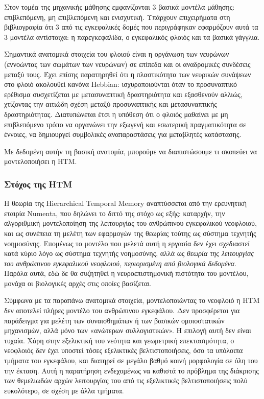   Στον τομέα της μηχανικής μάθησης εμφανίζονται 3 βασικά μοντέλα μάθησης: επιβλεπόμενη, μη επιβλεπόμενη και ενισχυτική.
  Υπάρχουν επιχειρήματα στη βιβλιογραφία \parencite{doyaWhatAreComputations1999} ότι 3 από τις εγκεφαλικές δομές που περιγράφηκαν εφαρμόζουν
  αυτά τα 3 μοντέλα αντίστοιχα: η παρεγκεφαλίδα, ο εγκεφαλικός φλοιός και τα βασικά γάγγλια.

  Σημαντικά ανατομικά στοιχεία του φλοιού είναι η οργάνωση των νευρώνων (εννοώντας των σωμάτων των νευρώνων) σε επίπεδα και οι αναδρομικές συνδέσεις μεταξύ τους.
  Έχει επίσης παρατηρηθεί ότι η πλαστικότητα των νευρικών συνάψεων στο φλοιό ακολουθεί κανόνα Hebbian:
  ισχυροποιούνται όταν το προσυναπτικό ερέθισμα συσχετίζεται με μετασυναπτική δραστηριότητα και εξασθενούν αλλιώς,
  χτίζοντας την αιτιώδη σχέση μεταξύ προσυναπτικής και μετασυναπτικής δραστηριότητας.
  Διατυπώνεται έτσι η υπόθεση ότι ο φλοιός μαθαίνει με μη επιβλεπόμενο τρόπο να οργανώνει την εξωγενή και εσωτερική πραγματικότητα σε έννοιες,
  να δημιουργεί συμβολικές αναπαραστάσεις για μεταβλητές κατάστασης.

  Με δεδομένη αυτήν τη βασική ανατομία, μπορούμε να διαπιστώσουμε τι σκοπεύει να μοντελοποιήσει η HTM.

\subsubsection{Στόχος της HTM}

  Η θεωρία της Hierarchical Temporal Memory αναπτύσσεται από την ερευνητική εταιρία Numenta, που δηλώνει το διττό της στόχο ως εξής:
  καταρχήν, την αλγοριθμική μοντελοποίηση της λειτουργίας του ανθρώπινου εγκεφαλικού νεοφλοιού,
  και ως συνέπεια τη μελέτη των εφαρμογών της θεωρίας τούτης ως σύστημα τεχνητής νοημοσύνης.
  Επομένως το μοντέλο που μελετά αυτή η εργασία δεν έχει σχεδιαστεί κατά κύριο λόγο ως σύστημα τεχνητής νοημοσύνης,
  αλλά ως \textit{θεωρία της λειτουργίας του ανθρώπινου εγκεφαλικού νεοφλοιού, περιορισμένη από βιολογικά δεδομένα}.
  Παρόλα αυτά, εδώ δε θα συζητηθεί η νευροεπιστημονική πιστότητα του μοντέλου, μονάχα οι βιολογικές αρχές στις οποίες βασίζεται.

  Σύμφωνα με τα παραπάνω ανατομικά στοιχεία, μοντελοποιώντας το νεοφλοιό η HTM δεν αποτελεί πλήρες μοντέλο
  του ανθρώπινου εγκεφάλου. Δεν προσφέρεται για παράδειγμα για μελέτη των συναισθημάτων ή των βασικών ομοιοστατικών
  μηχανισμών, αλλά μόνο των «ανώτερων συλλογιστικών». Η επιλογή αυτή δεν είναι τυχαία. Χάρη στην εξελικτική του νεότητα και
  γεωμετρική επεκτασιμότητα, ο νεοφλοιός δεν έχει υποστεί τόσες εξελικτικές βελτιστοποιήσεις, όσο τα υπόλοιπα τμήματα του εγκεφάλου,
  και διατηρεί σε μεγάλο βαθμό κοινή μορφολογία σε όλη του την έκταση. Αυτή η παρατήρηση ενδεχομένως να καθιστά το πρόβλημα
  της διάκρισης των θεμελιωδών αρχών λειτουργίας του από τις εξελικτικές βελτιστοποιήσεις πολύ ευκολότερο, σε σχέση με άλλα τμήματα.

